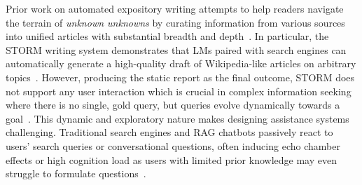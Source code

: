 \documentclass[11pt]{article}
\begin{document}
Prior work on automated expository writing attempts to help readers  navigate the terrain of \textit{unknown unknowns} by curating information from various sources into unified articles with substantial breadth and depth~\citep{shen2023summarization}. %
In particular, the STORM writing system demonstrates that LMs paired with search engines can automatically generate a high-quality draft of Wikipedia-like articles on arbitrary topics~\citep{shao2024assisting}. However, producing the static report as the final outcome, STORM does not support any user interaction which is crucial in complex information seeking %
where there is no single, gold query, but queries evolve dynamically towards a goal~\citep{Bates1989TheDO}. This dynamic and exploratory nature makes designing assistance systems challenging. Traditional search engines and RAG chatbots passively react to users' search queries or conversational questions, often inducing echo chamber effects \citep{sharma2024generative} or high cognition load as users with limited prior knowledge may even struggle to formulate questions~\citep{kuhlthau1991inside,belkin1982ask}.



\end{document}
